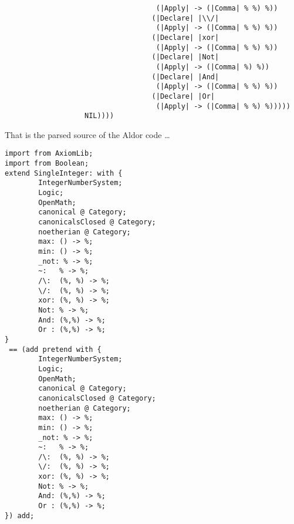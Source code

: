 \documentclass{article}
\begin{document}
\begin{verbatim}
                                    (|Apply| -> (|Comma| % %) %))
                                   (|Declare| |\\/|
                                    (|Apply| -> (|Comma| % %) %))
                                   (|Declare| |xor|
                                    (|Apply| -> (|Comma| % %) %))
                                   (|Declare| |Not|
                                    (|Apply| -> (|Comma| %) %))
                                   (|Declare| |And|
                                    (|Apply| -> (|Comma| % %) %))
                                   (|Declare| |Or|
                                    (|Apply| -> (|Comma| % %) %)))))
                   NIL))))
\end{verbatim}
That is the parsed source of the Aldor code \ldots
\begin{verbatim}
import from AxiomLib;
import from Boolean;
extend SingleInteger: with {
        IntegerNumberSystem;
        Logic;
        OpenMath;
        canonical @ Category;
        canonicalsClosed @ Category;
        noetherian @ Category;
        max: () -> %;
        min: () -> %;
        _not: % -> %;
        ~:   % -> %;
        /\:  (%, %) -> %;
        \/:  (%, %) -> %;
        xor: (%, %) -> %;
        Not: % -> %;
        And: (%,%) -> %;
        Or : (%,%) -> %;
}
 == (add pretend with {
        IntegerNumberSystem;
        Logic;
        OpenMath;
        canonical @ Category;
        canonicalsClosed @ Category;
        noetherian @ Category;
        max: () -> %;
        min: () -> %;
        _not: % -> %;
        ~:   % -> %;
        /\:  (%, %) -> %;
        \/:  (%, %) -> %;
        xor: (%, %) -> %;
        Not: % -> %;
        And: (%,%) -> %;
        Or : (%,%) -> %;
}) add;
\end{verbatim}











\end{document}
